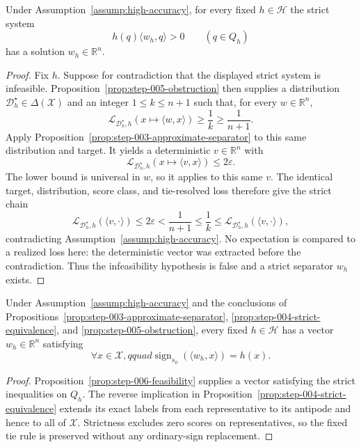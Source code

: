 \begin{proposition}
\label{prop:step-006-feasibility}
Under Assumption~\ref{assump:high-accuracy}, for every fixed
$h\in\mathcal H$ the strict system
\[
 h(q)\langle w_h,q\rangle>0\qquad(q\in Q_h)
\]
has a solution $w_h\in\mathbb R^n$.
\end{proposition}

\begin{proof}
Fix $h$.  Suppose for contradiction that the displayed strict system is
infeasible.  Proposition~\ref{prop:step-005-obstruction} then supplies a
distribution $\mathcal D_h^\star\in\Delta(\mathcal X)$ and an integer
$1\leq k\leq n+1$ such that, for every $w\in\mathbb R^n$,
\[
 \mathcal L_{\mathcal D_h^\star,h}(x\mapsto\langle w,x\rangle)
 \geq\frac1k\geq\frac1{n+1}.
\]
Apply Proposition~\ref{prop:step-003-approximate-separator} to this same
distribution and target.  It yields a deterministic $v\in\mathbb R^n$ with
\[
 \mathcal L_{\mathcal D_h^\star,h}(x\mapsto\langle v,x\rangle)
 \leq2\varepsilon.
\]
The lower bound is universal in $w$, so it applies to this same $v$.  The
identical target, distribution, score class, and tie-resolved loss therefore
give the strict chain
\[
 \mathcal L_{\mathcal D_h^\star,h}(\langle v,\cdot\rangle)
 \leq2\varepsilon
 <\frac1{n+1}
 \leq\frac1k
 \leq\mathcal L_{\mathcal D_h^\star,h}(\langle v,\cdot\rangle),
\]
contradicting Assumption~\ref{assump:high-accuracy}.  No expectation is
compared to a realized loss here: the deterministic vector was extracted
before the contradiction.  Thus the infeasibility hypothesis is false and a
strict separator $w_h$ exists.
\end{proof}

\begin{proposition}
\label{prop:step-006-exact-representation}
Under Assumption~\ref{assump:high-accuracy} and the conclusions of
Propositions~\ref{prop:step-003-approximate-separator},
\ref{prop:step-004-strict-equivalence}, and
\ref{prop:step-005-obstruction}, every fixed $h\in\mathcal H$ has a vector
$w_h\in\mathbb R^n$ satisfying
\[
\forall x\in\mathcal X,qquad
\operatorname{sign}_{s_0}(\langle w_h,x\rangle)=h(x).
\]
\end{proposition}

\begin{proof}
Proposition~\ref{prop:step-006-feasibility} supplies a vector satisfying the
strict inequalities on $Q_h$.  The reverse implication in
Proposition~\ref{prop:step-004-strict-equivalence} extends its exact labels
from each representative to its antipode and hence to all of $\mathcal X$.
Strictness excludes zero scores on representatives, so the fixed tie rule is
preserved without any ordinary-sign replacement.
\end{proof}

